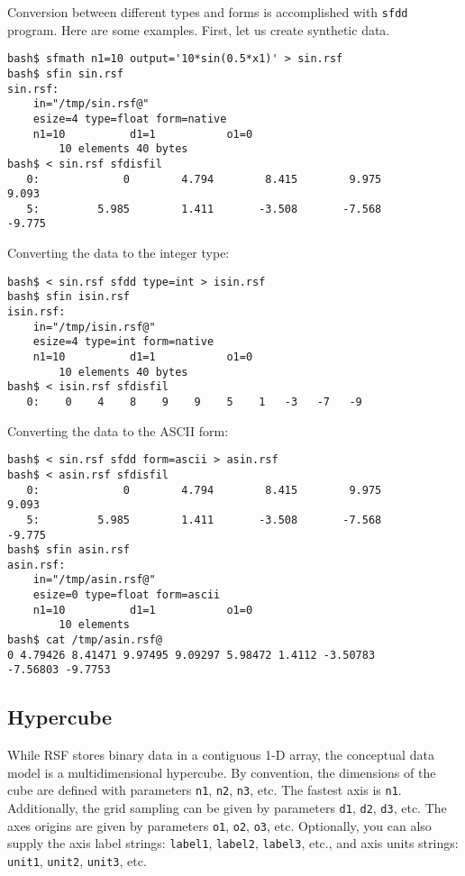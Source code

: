 Conversion between different types and forms is accomplished with
\texttt{sfdd} program. Here are some examples. First, let us create synthetic
data.
\begin{verbatim}
bash$ sfmath n1=10 output='10*sin(0.5*x1)' > sin.rsf
bash$ sfin sin.rsf
sin.rsf:
    in="/tmp/sin.rsf@"
    esize=4 type=float form=native
    n1=10          d1=1           o1=0
        10 elements 40 bytes
bash$ < sin.rsf sfdisfil
   0:             0        4.794        8.415        9.975        9.093
   5:         5.985        1.411       -3.508       -7.568       -9.775
\end{verbatim}
Converting the data to the integer type:
\begin{verbatim}
bash$ < sin.rsf sfdd type=int > isin.rsf
bash$ sfin isin.rsf
isin.rsf:
    in="/tmp/isin.rsf@"
    esize=4 type=int form=native
    n1=10          d1=1           o1=0
        10 elements 40 bytes
bash$ < isin.rsf sfdisfil
   0:    0    4    8    9    9    5    1   -3   -7   -9
\end{verbatim}
Converting the data to the ASCII form:
\begin{verbatim}
bash$ < sin.rsf sfdd form=ascii > asin.rsf
bash$ < asin.rsf sfdisfil
   0:             0        4.794        8.415        9.975        9.093
   5:         5.985        1.411       -3.508       -7.568       -9.775
bash$ sfin asin.rsf
asin.rsf:
    in="/tmp/asin.rsf@"
    esize=0 type=float form=ascii
    n1=10          d1=1           o1=0
        10 elements
bash$ cat /tmp/asin.rsf@
0 4.79426 8.41471 9.97495 9.09297 5.98472 1.4112 -3.50783
-7.56803 -9.7753
\end{verbatim}

\subsection{Hypercube}

While RSF stores binary data in a contiguous 1-D array, the conceptual
data model is a multidimensional hypercube. By convention, the
dimensions of the cube are defined with parameters \texttt{n1},
\texttt{n2}, \texttt{n3}, etc.  The fastest axis is \texttt{n1}.
Additionally, the grid sampling can be given by parameters
\texttt{d1}, \texttt{d2}, \texttt{d3}, etc. The axes origins are given
by parameters \texttt{o1}, \texttt{o2}, \texttt{o3}, etc. Optionally,
you can also supply the axis label strings: \texttt{label1},
\texttt{label2}, \texttt{label3}, etc., and axis units strings:
\texttt{unit1}, \texttt{unit2}, \texttt{unit3}, etc. 

